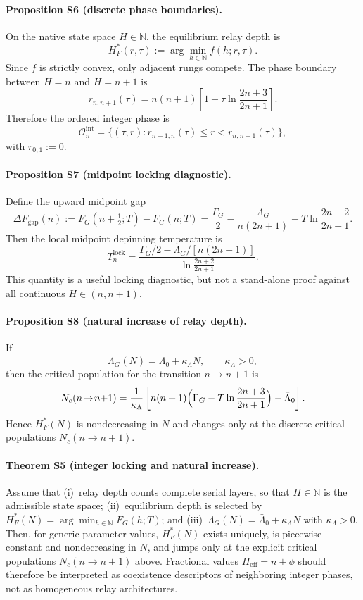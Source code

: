 \documentclass[11pt]{article}
\begin{document}
\paragraph{Proposition S6 (discrete phase boundaries).}
On the native state space $H\in\mathbb{N}$, the equilibrium relay depth is
\[
H_F^*(r,\tau):=\arg\min_{h\in\mathbb{N}} f(h;r,\tau).
\]
Since $f$ is strictly convex, only adjacent rungs compete.  The phase boundary
between $H=n$ and $H=n+1$ is
\[
r_{n,n+1}(\tau)
=
n(n+1)\!\left[
1-\tau\ln\!\frac{2n+3}{2n+1}
\right].
\]
Therefore the ordered integer phase is
\[
\mathcal{O}_n^{\mathrm{int}}
=
\{(\tau,r): r_{n-1,n}(\tau)\le r<r_{n,n+1}(\tau)\},
\]
with $r_{0,1}:=0$.

\paragraph{Proposition S7 (midpoint locking diagnostic).}
Define the upward midpoint gap
\[
\Delta F_{\mathrm{gap}}(n)
:=
F_G\!\left(n+\tfrac{1}{2};T\right)-F_G(n;T)
=
\frac{\Gamma_G}{2}
-\frac{\Lambda_G}{n(2n+1)}
-T\ln\!\frac{2n+2}{2n+1}.
\]
Then the local midpoint depinning temperature is
\[
T^{\mathrm{lock}}_n
=
\frac{\Gamma_G/2-\Lambda_G/[n(2n+1)]}
{\ln\!\frac{2n+2}{2n+1}}.
\]
This quantity is a useful locking diagnostic, but not a stand-alone proof
against all continuous $H\in(n,n+1)$.

\paragraph{Proposition S8 (natural increase of relay depth).}
If
\[
\Lambda_G(N)=\bar{\Lambda}_0+\kappa_\Lambda N,\qquad \kappa_\Lambda>0,
\]
then the critical population for the transition $n\to n+1$ is
\[
N_c(n\!\to\!n{+}1)
=
\frac{1}{\kappa_\Lambda}
\left[
n(n+1)\Bigl(\Gamma_G-T\ln\frac{2n+3}{2n+1}\Bigr)-\bar{\Lambda}_0
\right].
\]
Hence $H_F^*(N)$ is nondecreasing in $N$ and changes only at the discrete
critical populations $N_c(n\to n+1)$.

\paragraph{Theorem S5 (integer locking and natural increase).}
Assume that (i)~relay depth counts complete serial layers, so that
$H\in\mathbb{N}$ is the admissible state space; (ii)~equilibrium depth is
selected by $H_F^*(N)=\arg\min_{h\in\mathbb{N}}F_G(h;T)$; and
(iii)~$\Lambda_G(N)=\bar{\Lambda}_0+\kappa_\Lambda N$ with $\kappa_\Lambda>0$.
Then, for generic parameter values, $H_F^*(N)$ exists uniquely, is piecewise
constant and nondecreasing in $N$, and jumps only at the explicit critical
populations $N_c(n\to n+1)$ above.  Fractional values $H_{\mathrm{eff}}=n+\phi$
should therefore be interpreted as coexistence descriptors of neighboring
integer phases, not as homogeneous relay architectures.
\end{document}
